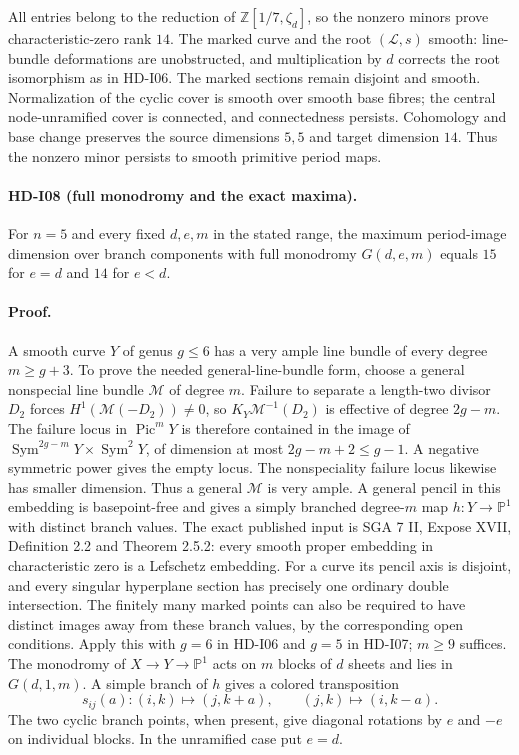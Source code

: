 All entries belong to the reduction of
$\mathbb Z[1/7,\zeta_d]$, so the nonzero minors prove
characteristic-zero rank $14$.
The marked curve and the root $(\mathcal L,s)$ smooth: line-bundle
deformations are unobstructed, and multiplication by $d$ corrects
the root isomorphism as in HD-I06. The marked sections remain disjoint
and smooth. Normalization of the cyclic cover is smooth over smooth
base fibres; the central node-unramified cover is connected, and
connectedness persists. Cohomology and base change preserves the
source dimensions $5,5$ and target dimension $14$. Thus the nonzero
minor persists to smooth primitive period maps.

\paragraph{HD-I08 (full monodromy and the exact maxima).}
For $n=5$ and every fixed $d,e,m$ in the stated range, the maximum
period-image dimension over branch components with full monodromy
$G(d,e,m)$ equals $15$ for $e=d$ and $14$ for $e<d$.

\paragraph{Proof.}
A smooth curve $Y$ of genus $g\le6$ has a very ample line bundle of
every degree $m\ge g+3$. To prove the needed general-line-bundle form,
choose a general nonspecial line bundle $\mathcal M$ of degree $m$.
Failure to separate a length-two divisor $D_2$ forces
$H^1(\mathcal M(-D_2))\ne0$, so
$K_Y\mathcal M^{-1}(D_2)$ is effective of degree $2g-m$.
The failure locus in $\operatorname{Pic}^mY$ is therefore contained
in the image of
$\operatorname{Sym}^{2g-m}Y\times\operatorname{Sym}^2Y$, of dimension
at most $2g-m+2\le g-1$. A negative symmetric power gives the empty
locus. The nonspeciality failure locus likewise has smaller dimension.
Thus a general $\mathcal M$ is very ample.
A general pencil in this embedding is basepoint-free and gives a
simply branched degree-$m$ map $h:Y\to\mathbb P^1$ with distinct branch
values. The exact published input is SGA 7 II, Expose XVII,
Definition 2.2 and Theorem 2.5.2: every smooth proper embedding in
characteristic zero is a Lefschetz embedding. For a curve its pencil
axis is disjoint, and every singular hyperplane section has precisely
one ordinary double intersection. The finitely many marked points
can also be required to have distinct images away from these branch
values, by the corresponding open conditions.
Apply this with $g=6$ in HD-I06 and $g=5$ in HD-I07; $m\ge9$ suffices.
The monodromy of $X\to Y\to\mathbb P^1$ acts on $m$ blocks of $d$
sheets and lies in $G(d,1,m)$. A simple branch of $h$ gives a colored
transposition
\[
s_{ij}(a):(i,k)\mapsto(j,k+a),\qquad(j,k)\mapsto(i,k-a).
\]
The two cyclic branch points, when present, give diagonal rotations
by $e$ and $-e$ on individual blocks. In the unramified case put $e=d$.

